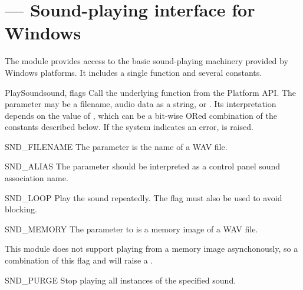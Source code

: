 \section{ ---
         Sound-playing interface for Windows}



The  module provides access to the basic
sound-playing machinery provided by Windows platforms.  It includes a
single function and several constants.


\begin{funcdesc}{PlaySound}{sound, flags}
  Call the underlying  function from the
  Platform API.  The  parameter may be a filename, audio
  data as a string, or .  Its interpretation depends on the
  value of , which can be a bit-wise ORed combination of
  the constants described below.  If the system indicates an error,
   is raised.
\end{funcdesc}


\begin{datadesc}{SND_FILENAME}
  The  parameter is the name of a WAV file.
\end{datadesc}

\begin{datadesc}{SND_ALIAS}
  The  parameter should be interpreted as a control panel
  sound association name.
\end{datadesc}

\begin{datadesc}{SND_LOOP}
  Play the sound repeatedly.  The  flag must also
  be used to avoid blocking.
\end{datadesc}

\begin{datadesc}{SND_MEMORY}
  The  parameter to  is a memory
  image of a WAV file.

    This module does not support playing from a memory
  image asynchonously, so a combination of this flag and
   will raise a .
\end{datadesc}

\begin{datadesc}{SND_PURGE}
  Stop playing all instances of the specified sound.
\end{datadesc}

